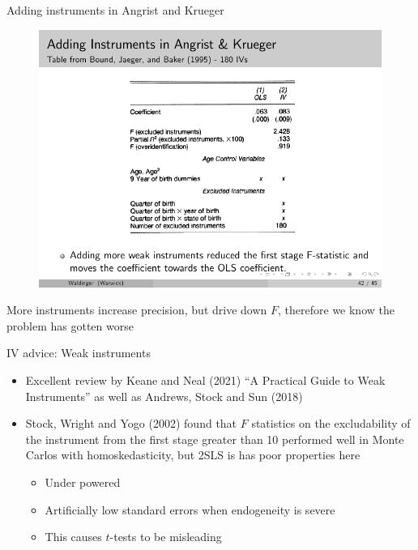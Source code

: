 \documentclass{beamer}
\begin{document}
\begin{frame}{Adding instruments in Angrist and Krueger}
	
	\begin{figure}
	\includegraphics{./lecture_includes/ak_iv2.pdf}
	\end{figure}
	
More instruments increase precision, but drive down $F$, therefore we know the problem has gotten worse
	
\end{frame}




\begin{frame}{IV advice: Weak instruments}

	\begin{itemize}
	\item Excellent review by Keane and Neal (2021) ``A Practical Guide to Weak Instruments''  as well as Andrews, Stock and Sun (2018)
	\item Stock, Wright and Yogo (2002) found that $F$ statistics on the excludability of the instrument from the first stage greater than 10 performed well in Monte Carlos with homoskedasticity, but 2SLS is has poor properties here
		\begin{itemize}
		\item Under powered
		\item Artificially low standard errors when endogeneity is severe
		\item This causes $t$-tests to be misleading
		\end{itemize}
	\end{itemize}

\end{frame}
\end{document}

